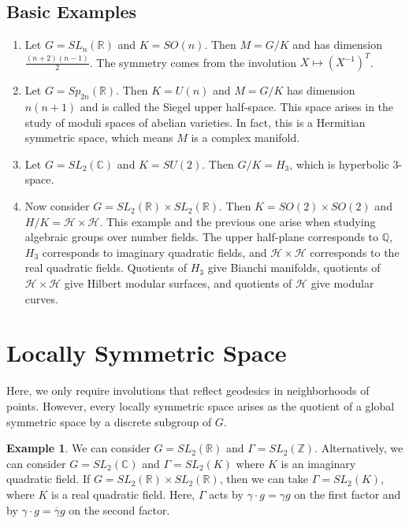 \documentclass[leqno, openany]{memoir}
\theoremstyle{definition}
\newtheorem{exm}[thm]{Example}
\theoremstyle{remark}
\theoremstyle{plain}
\theoremstyle{definition}
\theoremstyle{remark}
\newcommand{\R}{\mathbb{R}}
\newcommand{\C}{\mathbb{C}}
\newcommand{\Z}{\mathbb{Z}}
\newcommand{\Q}{\mathbb{Q}}
\newcommand{\mc}[1]{\mathcal{#1}}
\begin{document}
\subsection{Basic Examples}%
\label{sub:basic_examples}

\begin{enumerate}
    \item Let $G = SL_n(\R)$ and $K = SO(n)$. Then $M = G/K$ and has dimension $\frac{(n+2)(n-1)}{2}$. The symmetry comes from the involution $X \mapsto (X^{-1})^T$.
    \item Let $G = Sp_{2n}(\R)$. Then $K = U(n)$ and $M = G/K$ has dimension $n(n+1)$ and is called the Siegel upper half-space. This space arises in the study of moduli spaces of abelian varieties. In fact, this is a Hermitian symmetric space, which means $M$ is a complex manifold.
    \item Let $G = SL_2(\C)$ and $K = SU(2)$. Then $G/K = H_3$, which is hyperbolic $3$-space.
    \item Now consider $G = SL_2(\R) \times SL_2(\R)$. Then $K = SO(2) \times SO(2)$ and $H/K = \mc{H} \times \mc{H}$. This example and the previous one arise when studying algebraic groups over number fields. The upper half-plane corresponds to $\Q$, $H_3$ corresponds to imaginary quadratic fields, and $\mc{H} \times \mc{H}$ corresponds to the real quadratic fields. Quotients of $H_3$ give Bianchi manifolds, quotients of $\mc{H} \times \mc{H}$ give Hilbert modular surfaces, and quotients of $\mc{H}$ give modular curves.
\end{enumerate}

\section{Locally Symmetric Space}%
\label{sec:locally_symmetric_space}

Here, we only require involutions that reflect geodesics in neighborhoods of points. However, every locally symmetric space arises as the quotient of a global symmetric space by a discrete subgroup of $G$.

\begin{exm}
    We can consider $G = SL_2(\R)$ and $\Gamma = SL_2(\Z)$. Alternatively, we can consider $G = SL_2(\C)$ and $\Gamma = SL_2(K)$ where $K$ is an imaginary quadratic field. If $G = SL_2(\R) \times SL_2(\R)$, then we can take $\Gamma = SL_2(K)$, where $K$ is a real quadratic field. Here, $\Gamma$ acts by $\gamma \cdot g = \gamma g$ on the first factor and by $\gamma \cdot g = \overline{\gamma} g$ on the second factor.
\end{exm}
\end{document}

